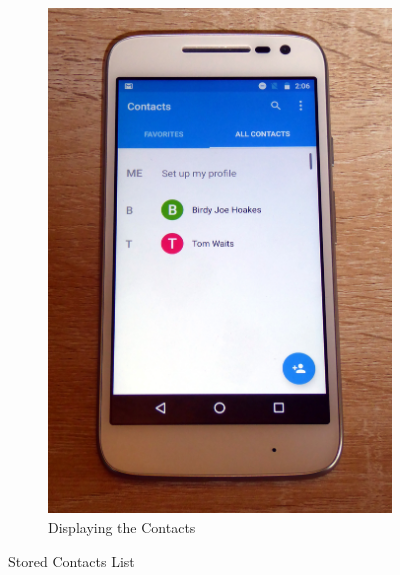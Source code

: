 \begin{figure}
\begin{subfigure}{0.49\textwidth}
        \includegraphics[height=0.45\textheight]{graphics/PhonePhotos/03 - DisplayContacts.jpg}
        \caption{Displaying the Contacts}
        \label{fig:DisplayingContacts}
	\end{subfigure}
	\caption{Stored Contacts List}
	\label{fig:ContactsList}
\end{figure}

